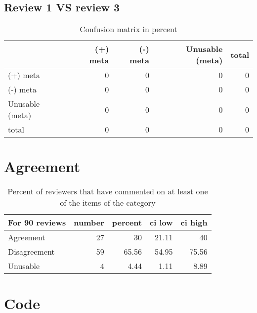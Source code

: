 \documentclass{article}
\begin{document}
\subsection{Review 1 VS review 3} 

\begin{table}[H]

\centering

\begin{tabular}{lrrrr}
\hline
                 &   (+) meta &   (-) meta &   Unusable (meta) &   total \\
\hline
 (+) meta        &          0 &          0 &                 0 &       0 \\
 (-) meta        &          0 &          0 &                 0 &       0 \\
 Unusable (meta) &          0 &          0 &                 0 &       0 \\
 total           &          0 &          0 &                 0 &       0 \\
\hline
\end{tabular}\caption{Confusion matrix in percent}

\end{table}



\section{Agreement} 

\begin{table}[H]

\centering

\begin{tabular}{lrrrr}
\hline
 For 90 reviews   &   number &   percent &   ci low &   ci high \\
\hline
 Agreement        &       27 &     30    &    21.11 &     40    \\
 Disagreement     &       59 &     65.56 &    54.95 &     75.56 \\
 Unusable         &        4 &      4.44 &     1.11 &      8.89 \\
\hline
\end{tabular}\caption{Percent of reviewers that have commented on at least one of the items of the category}

\end{table}



\section{Code} 
\end{document}
